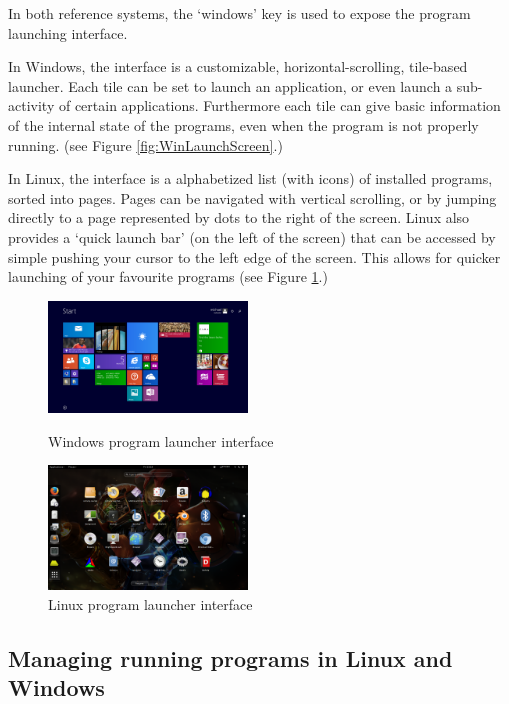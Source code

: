 \documentclass[a4paper]{report}
\begin{document}
In both reference systems, the `windows' key is used to expose the program launching interface.

In Windows, the interface is a customizable, horizontal-scrolling, tile-based launcher. Each tile can be set to launch an application, or even launch a sub-activity of certain applications. Furthermore each tile can give basic information of the internal state of the programs, even when the program is not properly running. (see Figure \ref{fig:WinLaunchScreen}.)


In Linux, the interface is a alphabetized list (with icons) of installed programs, sorted into pages. Pages can be navigated with vertical scrolling, or by jumping directly to a page represented by dots to the right of the screen. Linux also provides a `quick launch bar' (on the left of the screen) that can be accessed by simple pushing your cursor to the left edge of the screen. This allows for quicker launching of your favourite programs (see Figure \ref{fig:LinLaunchScreen}.)


\begin{figure}[ht]
\centering
\begin{minipage}{.5\textwidth}
  \centering
  \includegraphics[width=200px]{images/Windows_Program_Launcher_Screenshot}
  \caption{Windows program launcher interface}
  \label{fig:WinLaunchScreen}
\end{minipage}%
\begin{minipage}{.5\textwidth}
  \centering
  \includegraphics[width=200px]{images/Linux_Program_Launcher_Screenshot}
  \caption{Linux program launcher interface}
  \label{fig:LinLaunchScreen}
\end{minipage}
\end{figure}


\subsection{Managing running programs in Linux and Windows}
\end{document}
